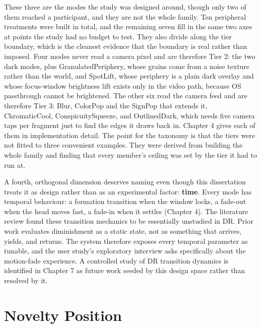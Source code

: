 These three are the modes the study was designed around, though only two of them reached a
participant, and they are not the whole family. Ten peripheral treatments were
built in total, and the remaining seven fill in the same two axes at points the study had no budget
to test. They also divide along the tier boundary, which is the cleanest evidence that the boundary
is real rather than imposed. Four modes never read a camera pixel and are therefore Tier 2: the two
dark modes, plus GranulatedPeriphery, whose grains come from a noise texture rather than the world,
and SpotLift, whose periphery is a plain dark overlay and whose focus-window brightness lift exists
only in the video path, because OS passthrough cannot be brightened. The other six read the camera
feed and are therefore Tier 3: Blur, ColorPop and the SignPop that extends it, ChromaticCool,
ConspicuitySqueeze, and OutlinedDark, which needs five camera taps per fragment just to find the
edges it draws back in. Chapter 4 gives each of them in implementation detail. The point for the
taxonomy is that the tiers were not fitted to three convenient examples. They were derived from
building the whole family and finding that every member's ceiling was set by the tier it had to run
at.

A fourth, orthogonal dimension deserves naming even though this dissertation treats it as design
rather than as an experimental factor: \textbf{time}. Every mode has temporal behaviour: a formation
transition when the window locks, a fade-out when the head moves fast, a fade-in when it settles
(Chapter 4). The literature review found these transition mechanics to be essentially unstudied
in DR. Prior work evaluates diminishment as a static state, not as something that arrives, yields,
and returns. The system therefore exposes every temporal parameter as tunable, and the user study's
exploratory interview asks specifically about the motion-fade experience. A controlled study of DR
transition dynamics is identified in Chapter 7 as future work seeded by this design space rather than
resolved by it.


\section{Novelty Position}

